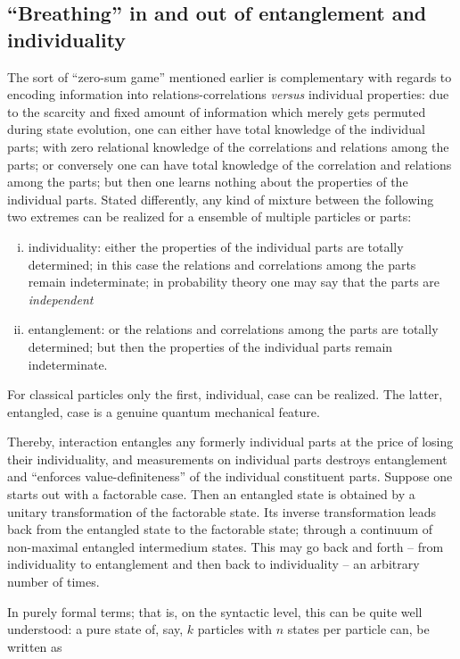 \subsection{``Breathing'' in and out of entanglement and individuality}

The  sort of  ``zero-sum game'' mentioned earlier is complementary
with regards to encoding information into relations-correlations {\it versus} individual properties:
due to the scarcity and fixed amount of information which merely gets permuted during state evolution,
one can either have total knowledge of the individual parts; with zero relational  knowledge of the correlations and relations among the parts;
or conversely
one can  have total knowledge of the correlation and relations among the parts; but then one learns nothing about the properties of the individual parts.
Stated differently, any kind of mixture between the following two extremes can be realized for a ensemble of multiple particles or parts:
\begin{enumerate}[(i)]
\item
individuality: either the properties of the individual parts are totally determined; in this case the relations and correlations among the parts remain indeterminate;
in probability theory one may say that the parts are
{\em independent}~\cite[\S~45]{Halmos-MeasureTheory}
\item
entanglement: or the relations and correlations among the parts are totally determined; but then the properties of the individual parts remain indeterminate.
\end{enumerate}
For classical particles only the first, individual, case can be realized.
The latter, entangled, case is a genuine quantum mechanical feature.

Thereby, interaction entangles any formerly individual parts at the price of losing their individuality,
and measurements on individual parts destroys entanglement and ``enforces value-definiteness'' of the individual constituent parts.
Suppose one starts out with a factorable case. Then an entangled state is obtained by a unitary transformation of the factorable state.
Its inverse transformation leads back from the entangled state to the factorable state;
through a continuum of non-maximal entangled intermedium states.
This may go back and forth -- from individuality to entanglement and then back to individuality -- an arbitrary number of times.




In purely formal terms; that is, on the syntactic level,
this can be quite well understood: a pure state of, say, $k$ particles with $n$ states per particle can, be written as

